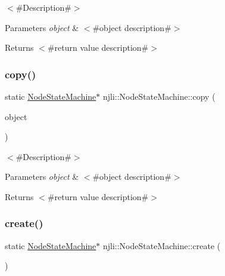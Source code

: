 $<$\#\+Description\#$>$


\begin{DoxyParams}{Parameters}
{\em object} & $<$\#object description\#$>$\\
\hline
\end{DoxyParams}
\begin{DoxyReturn}{Returns}
$<$\#return value description\#$>$ 
\end{DoxyReturn}
\mbox{\label{classnjli_1_1_node_state_machine_a233206f0db79b5aa14486b7aa8167578}} 
\subsubsection{\texorpdfstring{copy()}{copy()}}
{\footnotesize\ttfamily static \mbox{\hyperlink{classnjli_1_1_node_state_machine}{Node\+State\+Machine}}$\ast$ njli\+::\+Node\+State\+Machine\+::copy (\begin{DoxyParamCaption}\item[{const \mbox{\hyperlink{classnjli_1_1_node_state_machine}{Node\+State\+Machine}} \&}]{object }\end{DoxyParamCaption})\hspace{0.3cm}{\ttfamily [static]}}

$<$\#\+Description\#$>$


\begin{DoxyParams}{Parameters}
{\em object} & $<$\#object description\#$>$\\
\hline
\end{DoxyParams}
\begin{DoxyReturn}{Returns}
$<$\#return value description\#$>$ 
\end{DoxyReturn}
\mbox{\label{classnjli_1_1_node_state_machine_ad5595d3273e958005648a848bf8d8c9d}} 
\subsubsection{\texorpdfstring{create()}{create()}\hspace{0.1cm}{\footnotesize\ttfamily [1/2]}}
{\footnotesize\ttfamily static \mbox{\hyperlink{classnjli_1_1_node_state_machine}{Node\+State\+Machine}}$\ast$ njli\+::\+Node\+State\+Machine\+::create (\begin{DoxyParamCaption}{ }\end{DoxyParamCaption})\hspace{0.3cm}{\ttfamily [static]}}

